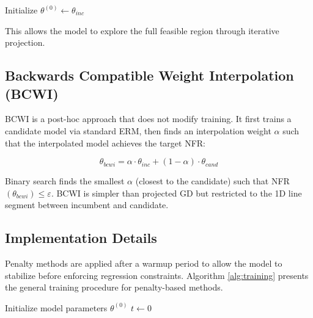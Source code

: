 \documentclass[12pt, letterpaper]{article}
\theoremstyle{remark}
\begin{document}
\begin{algorithm}
\caption{Projected Gradient Descent for NFR Constraint}
\label{alg:projected}
Initialize $\theta^{(0)} \leftarrow \theta_{inc}$\;
\end{algorithm}

This allows the model to explore the full feasible region through iterative projection.

\subsection{Backwards Compatible Weight Interpolation (BCWI)}

BCWI is a post-hoc approach that does not modify training. It first trains a candidate model via standard ERM, then finds an interpolation weight $\alpha$ such that the interpolated model achieves the target NFR:

\begin{equation}
\theta_{bcwi} = \alpha \cdot \theta_{inc} + (1-\alpha) \cdot \theta_{cand}
\end{equation}

Binary search finds the smallest $\alpha$ (closest to the candidate) such that NFR$(\theta_{bcwi}) \leq \varepsilon$. BCWI is simpler than projected GD but restricted to the 1D line segment between incumbent and candidate.

\subsection{Implementation Details}

Penalty methods are applied after a warmup period to allow the model to stabilize before enforcing regression constraints. Algorithm \ref{alg:training} presents the general training procedure for penalty-based methods.

\begin{algorithm}
\caption{Penalty-Based Training with Regression Prevention}
\label{alg:training}
Initialize model parameters $\theta^{(0)}$\;
$t \leftarrow 0$\;
\end{algorithm}
\end{document}
